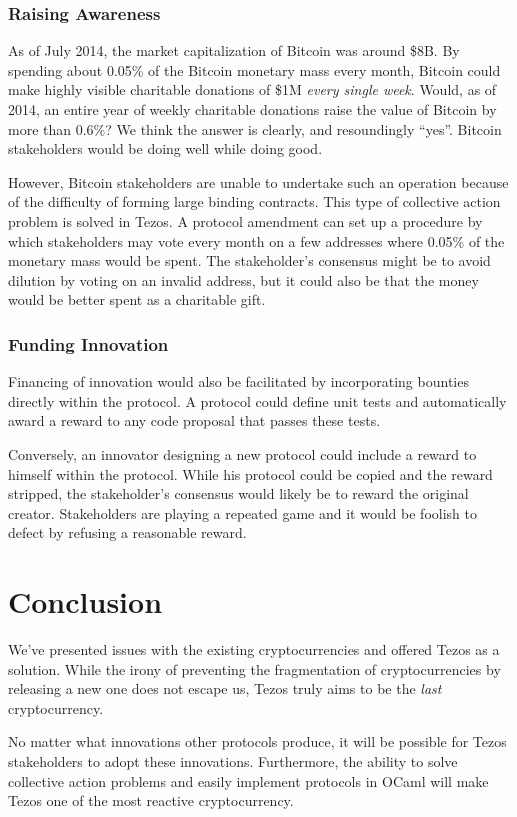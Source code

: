 \documentclass[letterpaper]{article}
\begin{document}
\subsubsection{Raising Awareness}

As of July 2014, the market capitalization of Bitcoin was around \$8B.
By spending about 0.05\% of the Bitcoin monetary mass every month,
Bitcoin could make highly visible
charitable donations of \$1M \emph{every single week}.
Would, as of 2014, an entire year of weekly charitable donations
raise the value of Bitcoin by more than 0.6\%?
We think the answer is clearly, and resoundingly ``yes''.
Bitcoin stakeholders would be doing well while doing good.

However, Bitcoin stakeholders are unable to undertake such an operation
because of the difficulty of forming large binding contracts. This type
of collective action problem is solved in Tezos.
A protocol amendment can set up a procedure by which
stakeholders may vote every month on a few addresses
where 0.05\% of the monetary mass would be spent.
The stakeholder's consensus might be to avoid dilution
by voting on an invalid address,
but it could also be that the money would be better spent as a charitable gift.

\subsubsection{Funding Innovation}

Financing of innovation would also be facilitated
by incorporating bounties directly within the protocol.
A protocol could define unit tests and automatically award a reward
to any code proposal that passes these tests.

Conversely, an innovator designing a new protocol
could include a reward to himself within the protocol.
While his protocol could be copied and the reward stripped,
the stakeholder's consensus would likely be to reward the original creator.
Stakeholders are playing a repeated game
and it would be foolish to defect by refusing a reasonable reward.


\section*{Conclusion}

We've presented issues with the existing cryptocurrencies
and offered Tezos as a solution.
While the irony of preventing the fragmentation of cryptocurrencies
by releasing a new one does not escape us, %
Tezos truly aims to be the \emph{last} cryptocurrency.

No matter what innovations other protocols produce,
it will be possible for Tezos stakeholders to adopt these innovations.
Furthermore, the ability to solve collective action problems
and easily implement protocols in OCaml will make Tezos one of the most reactive cryptocurrency.



\end{document}
